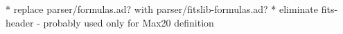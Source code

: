 

* replace parser/formulas.ad? with  parser/fitslib-formulas.ad?
* eliminate fits-header - probably used only for Max20 definition
